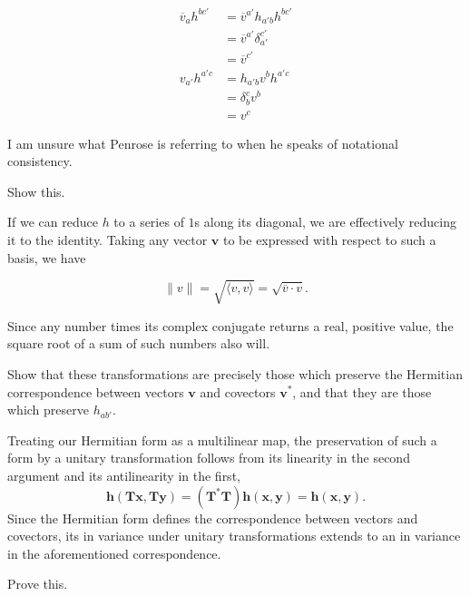 \documentclass[../the-road-to-reality.tex]{subfiles}
\begin{document}
\begin{questions}
\begin{solution}
	\begin{align*}
		\overline{v}_ah^{bc'} &= \overline{v}^{a'}h_{a'b}h^{bc'} \\
				      &= \overline{v}^{a'}\delta_{a'}^{c'} \\
				      &= \overline{v}^{c'} \\
		v_{a'}h^{a'c} &= h_{a'b}v^bh^{a'c} \\
			      &= \delta^c_bv^b \\
			      &= v^c 
	\end{align*}

	I am unsure what Penrose is referring to when he speaks of notational consistency.
\end{solution}

\question Show this.

\begin{solution}
	If we can reduce $h$ to a series of $1$s along its diagonal, we are effectively reducing it to the identity. Taking any vector $\mathbf{v}$ to be expressed with respect to such a basis, we have

	\[
	\|{v}\| = \sqrt{\langle{v, v}\rangle} = \sqrt{\overline{v}\cdot{v}} 
	.\] 

	Since any number times its complex conjugate returns a real, positive value, the square root of a sum of such numbers also will.
\end{solution}

\question Show that these transformations are precisely those which preserve the Hermitian correspondence between vectors $\mathbf{v}$ and covectors $\mathbf{v}^*$, and that they are those which preserve $h_{ab'}$.

\begin{solution}
	Treating our Hermitian form as a multilinear map, the preservation of such a form by a unitary transformation follows from its linearity in the second argument and its antilinearity in the first,
	\[
	\mathbf{h}(\mathbf{Tx},\mathbf{Ty}) = (\mathbf{T}^*\mathbf{T})\mathbf{h}(\mathbf{x},\mathbf{y}) = \mathbf{h}(\mathbf{x},\mathbf{y}).
	\] 
	Since the Hermitian form defines the correspondence between vectors and covectors, its in variance under unitary transformations extends to an in variance in the aforementioned correspondence.	
\end{solution}

\question Prove this.


\end{questions}
\end{document}
